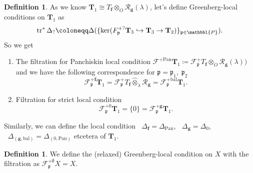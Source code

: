 \documentclass[10pt]{amsart}
\numberwithin{equation}{section}
\theoremstyle{definition}
\newtheorem{defn}[thm]{Definition}
\theoremstyle{remark} %
\newcommand{\pan}{\mathrm{Pan}}
\DeclareMathOperator{\tr}{{tr}^*}
\renewcommand{\b}{\mathrm{bal}}
\newcommand{\f}{\mathbf{f}}
\newcommand{\scrF}{\mathscr{F}}
\newcommand{\g}{\mathbf{g}}
\newcommand{\p}{\mathfrak{p}}
\newcommand{\bP}{\mathbbl{P}}
\newcommand{\R}{\mathcal{R}}
\newcommand{\T}{\mathbf{T}}
\newcommand{\hotimes}{\widehat{\otimes}}
\begin{document}
	\begin{defn}
		As we know $ \T_1 \cong T_\f \otimes_O \R_\g(\lambda) $, let's define Greenberg-local conditions on $ \T_1 $ as $$ \tr \Delta_? \coloneqq \Delta(\{\ker(F_\p^{+?}\T_{3} \hookrightarrow \T_{3} \rightarrow \T_{2} )\}_{\p \in \bP}).$$
		So we get 
		\begin{enumerate}[label=(\roman*)]
			\item The filtration for Panchiskin local condition $ \scrF^{+\pan}\T_1 \coloneqq \scrF^{+}_{\p}T_{\f} \otimes_O  \R_\g(\lambda)) $ and we have the following correspondence for $ \p = \p_1, \; \p_2  $  
			$$ \scrF^{+\mathbf{f}}_{\p}\T_1= \scrF^{+}_{\p}T_\f \hotimes_\lambda \R_\g = \scrF^{+\mathrm{bal}}_{\p}\T_1.$$ 
			\item Filtration for strict local condition $$ \scrF^{+0}_{\p}\T_1 =\{0\} =\scrF^{+\g}_{\p}\T_1.$$
		\end{enumerate}
	\end{defn}
	Similarly, we can define the local condition $ \tr\Delta_{\f} = \Delta_\pan $, $ \tr \Delta_{\g} = \Delta_0 $, $ \tr \Delta_{(\g, \b)} = \Delta_{(0,\pan)} $ etcetera of $ \T_1 $.
	\begin{defn}
		We define the (relaxed) Greenberg-local condition on $ X $ with the filtration as $ \scrF^{+\emptyset}_\p X = X $.
	\end{defn}
	
\end{document}
